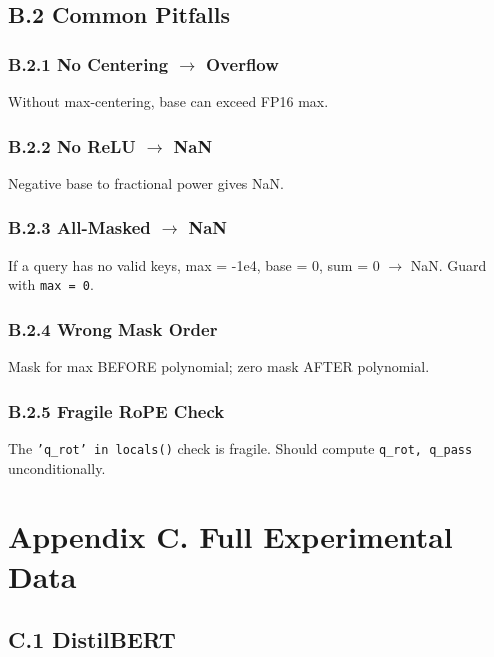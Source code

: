 \subsection{B.2 Common Pitfalls}

\subsubsection{B.2.1 No Centering $\to$ Overflow}

Without max-centering, base can exceed FP16 max.

\subsubsection{B.2.2 No ReLU $\to$ NaN}

Negative base to fractional power gives NaN.

\subsubsection{B.2.3 All-Masked $\to$ NaN}

If a query has no valid keys, max = -1e4, base = 0, sum = 0 $\to$ NaN. 
Guard with \texttt{max = 0}.

\subsubsection{B.2.4 Wrong Mask Order}

Mask for max BEFORE polynomial; zero mask AFTER polynomial.

\subsubsection{B.2.5 Fragile RoPE Check}

The \texttt{'q\_rot' in locals()} check is fragile. Should compute \texttt{q\_rot, q\_pass} 
unconditionally.



\section{Appendix C. Full Experimental Data}

\subsection{C.1 DistilBERT}

